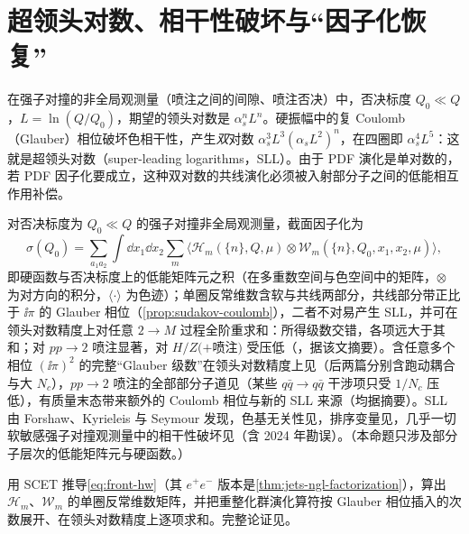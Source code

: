 \section{超领头对数、相干性破坏与“因子化恢复”}\label{sec:front-sll}

在强子对撞的非全局观测量（喷注之间的间隙、喷注否决）中，否决标度 $Q_0\ll Q$，$L=\ln(Q/Q_0)$，期望的领头对数是 $\alpha_s^nL^n$。硬振幅中的复 Coulomb（Glauber）相位破坏色相干性，产生\emph{双}对数 $\alpha_s^3L^3(\alpha_sL^2)^n$，在四圈即 $\alpha_s^4L^5$：这就是超领头对数（super-leading logarithms，SLL）。由于 PDF 演化是单对数的，若 PDF 因子化要成立，这种双对数的共线演化必须被入射部分子之间的低能相互作用补偿。

\begin{proposition}\label{prop:front-sll-all-orders}
对否决标度为 $Q_0\ll Q$ 的强子对撞非全局观测量，截面因子化为
\begin{equation}\label{eq:front-hw}
\sigma(Q_0)=\sum_{a_1a_2}\int\dd x_1\dd x_2\sum_m\bigl\langle\mathcal H_m(\{n\},Q,\mu)\otimes\mathcal W_m(\{n\},Q_0,x_1,x_2,\mu)\bigr\rangle ,
\end{equation}
即硬函数与否决标度上的低能矩阵元之积（在多重数空间与色空间中的矩阵，$\otimes$ 为对方向的积分，$\langle\cdot\rangle$ 为色迹）；单圈反常维数含软与共线两部分，共线部分带正比于 $\ii\pi$ 的 Glauber 相位（\cref{prop:sudakov-coulomb}），二者不对易产生 SLL，并可在领头对数精度上对任意 $2\to M$ 过程全阶重求和：所得级数交错，各项远大于其和；对 $pp\to2$ 喷注显著，对 $H/Z(+$喷注$)$ 受压低（\cite{Becher:2023mtx}，据该文摘要）。含任意多个相位 $(\ii\pi)^2$ 的完整“Glauber 级数”在领头对数精度上见\cite{Boer:2023jsy,Boer:2023ljq,Boer:2024hzh,Boer:2024xzy}（后两篇分别含跑动耦合与大 $N_c$），$pp\to2$ 喷注的全部部分子道见\cite{Becher:2024nqc}（某些 $q\bar q\to q\bar q$ 干涉项只受 $1/N_c$ 压低），有质量末态带来额外的 Coulomb 相位与新的 SLL 来源\cite{Banerjee:2025kkq}（均据摘要）。SLL 由 Forshaw、Kyrieleis 与 Seymour 发现\cite{ForshawKyrieleisSeymour2006}，色基无关性见\cite{Forshaw:2008cq}，排序变量见\cite{Angeles-Martinez:2015rna}，几乎一切软敏感强子对撞观测量中的相干性破坏见\cite{Forshaw:2021fxs}（含 2024 年勘误）。（本命题只涉及部分子层次的低能矩阵元与硬函数。）
\end{proposition}

\begin{proofsketch}
用 SCET 推导\cref{eq:front-hw}（其 $e^+e^-$ 版本是\cref{thm:jets-ngl-factorization}），算出 $\mathcal H_m$、$\mathcal W_m$ 的单圈反常维数矩阵，并把重整化群演化算符按 Glauber 相位插入的次数展开、在领头对数精度上逐项求和。完整论证见\cite{Becher:2023mtx}。
\end{proofsketch}

